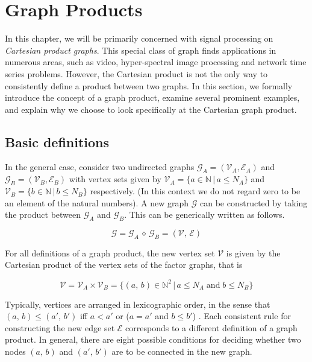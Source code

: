 \section{Graph Products}

\label{sec:reg_and_rec_intro}

In this chapter, we will be primarily concerned with signal processing on \textit{Cartesian product graphs}. This special class of graph finds applications in numerous areas, such as video, hyper-spectral image processing and network time series problems. However, the Cartesian product is not the only way to consistently define a product between two graphs. In this section, we formally introduce the concept of a graph product, examine several prominent examples, and explain why we choose to look specifically at the Cartesian graph product.

\subsection{Basic definitions}

\label{sec:graph_products_defined}

In the general case, consider two undirected graphs $\mathcal{G}_A = (\mathcal{V}_A, \mathcal{E}_A)$ and $\mathcal{G}_B = (\mathcal{V}_B, \mathcal{E}_B)$ with vertex sets given by $\mathcal{V}_A = \{a \in \mathbb{N} \, | \, a \leq N_A \}$ and $\mathcal{V}_B = \{b \in \mathbb{N} \, | \, b \leq N_B \}$ respectively. (In this context we do not regard zero to be an element of the natural numbers). A new graph $\mathcal{G}$ can be constructed by taking the product between $\mathcal{G}_A$ and $\mathcal{G}_B$. This can be generically written as follows.

\begin{equation}
    \mathcal{G} = \mathcal{G}_A \, \diamond \, \mathcal{G}_B = (\mathcal{V}, \, \mathcal{E})
\end{equation}

For all definitions of a graph product, the new vertex set $\mathcal{V}$ is given by the Cartesian product of the vertex sets of the factor graphs, that is

\begin{equation}
    \mathcal{V} = \mathcal{V}_A \times \mathcal{V}_B = \{(a, \, b) \in \mathbb{N}^2 \, | \, a \leq N_A \; \text{and} \; b \leq N_B \}
\end{equation}


Typically, vertices are arranged in lexicographic order, in the sense that $(a, \, b) \leq (a',\, b')$ iff $a < a'$ or ($a = a'$ and $b \leq b'$) \citep{Harzheim2005}. Each consistent rule for constructing the new edge set $\mathcal{E}$ corresponds to a different definition of a graph product. In general, there are eight possible conditions for deciding whether two nodes $(a, \, b)$ and $(a',\,  b')$ are to be connected in the new graph.


